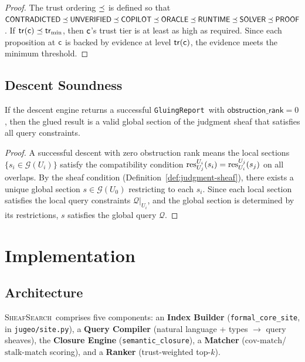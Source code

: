 \documentclass[11pt]{article}
\newcommand{\SemanticClosure}{\texttt{semantic\_closure}}
\newcommand{\FormalCoreSite}{\texttt{formal\_core\_site}}
\newcommand{\QuerySheaf}{\mathcal{Q}}
\newcommand{\CoverMatch}{\mathrm{cov\text{-}match}}
\newcommand{\StalknMatch}{\mathrm{stalk\text{-}match}}
\newcommand{\CodeSearch}{\textsc{SheafSearch}}
\newcommand{\tr}{\mathsf{tr}}                        %
\newcommand{\GluingReport}{\texttt{GluingReport}}    %
\begin{document}
\begin{proof}
The trust ordering $\preceq$ is defined so that
$\mathsf{CONTRADICTED} \preceq \mathsf{UNVERIFIED} \preceq \mathsf{COPILOT} \preceq \mathsf{ORACLE} \preceq
\mathsf{RUNTIME} \preceq \mathsf{SOLVER} \preceq \mathsf{PROOF}$.
If $\tr(\coord) \tleq \tr_{\min}$, then $\mathsf{c}$'s trust tier is at
least as high as required.  Since each proposition at $\mathsf{c}$ is
backed by evidence at level $\tr(\coord)$, the evidence meets the
minimum threshold.
\end{proof}

\subsection{Descent Soundness}

\begin{theorem}\label{thm:descent-sound}
If the descent engine returns a successful \GluingReport\ with
$\mathsf{obstruction\_rank} = 0$, then the glued result is a valid
global section of the judgment sheaf that satisfies all query constraints.
\end{theorem}

\begin{proof}
A successful descent with zero obstruction rank means the local
sections $\{s_i \in \mathcal{G}(U_i)\}$ satisfy the compatibility
condition $\mathrm{res}_{U_j}^{U_i}(s_i) = \mathrm{res}_{U_i}^{U_j}(s_j)$ on all
overlaps.  By the sheaf condition (Definition~\ref{def:judgment-sheaf}),
there exists a unique global section $s \in \mathcal{G}(U_0)$ restricting
to each $s_i$.  Since each local section satisfies the local query
constraints $\QuerySheaf|_{U_i}$, and the global section is determined
by its restrictions, $s$ satisfies the global query $\QuerySheaf$.
\end{proof}

\section{Implementation}\label{sec:implementation}

\subsection{Architecture}
\CodeSearch\ comprises five components: an \textbf{Index Builder}
(\FormalCoreSite, in \texttt{jugeo/site.py}), a \textbf{Query Compiler}
(natural language + types $\to$ query sheaves), the \textbf{Closure
Engine} (\SemanticClosure), a \textbf{Matcher}
($\CoverMatch$/$\StalknMatch$ scoring), and a \textbf{Ranker}
(trust-weighted top-$k$).
\end{document}
